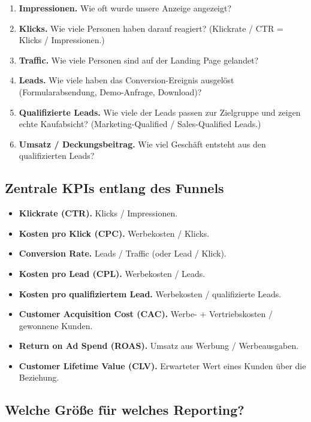 \documentclass[11pt,a4paper,oneside]{article}
\newcommand{\fachbegriff}[1]{\textbf{#1}}
\begin{document}
\begin{enumerate}
  \item \fachbegriff{Impressionen.} Wie oft wurde unsere Anzeige angezeigt?
  \item \fachbegriff{Klicks.} Wie viele Personen haben darauf reagiert? (Klickrate / CTR = Klicks / Impressionen.)
  \item \fachbegriff{Traffic.} Wie viele Personen sind auf der Landing Page gelandet?
  \item \fachbegriff{Leads.} Wie viele haben das Conversion-Ereignis ausgelöst (Formularabsendung, Demo-Anfrage, Download)?
  \item \fachbegriff{Qualifizierte Leads.} Wie viele der Leads passen zur Zielgruppe und zeigen echte Kaufabsicht? (Marketing-Qualified / Sales-Qualified Leads.)
  \item \fachbegriff{Umsatz / Deckungsbeitrag.} Wie viel Geschäft entsteht aus den qualifizierten Leads?
\end{enumerate}

\subsection{Zentrale KPIs entlang des Funnels}

\begin{itemize}
  \item \fachbegriff{Klickrate (CTR).} Klicks / Impressionen.
  \item \fachbegriff{Kosten pro Klick (CPC).} Werbekosten / Klicks.
  \item \fachbegriff{Conversion Rate.} Leads / Traffic (oder Lead / Klick).
  \item \fachbegriff{Kosten pro Lead (CPL).} Werbekosten / Leads.
  \item \fachbegriff{Kosten pro qualifiziertem Lead.} Werbekosten / qualifizierte Leads.
  \item \fachbegriff{Customer Acquisition Cost (CAC).} Werbe- + Vertriebskosten / gewonnene Kunden.
  \item \fachbegriff{Return on Ad Spend (ROAS).} Umsatz aus Werbung / Werbeausgaben.
  \item \fachbegriff{Customer Lifetime Value (CLV).} Erwarteter Wert eines Kunden über die Beziehung.
\end{itemize}

\subsection{Welche Größe für welches Reporting?}
\end{document}
